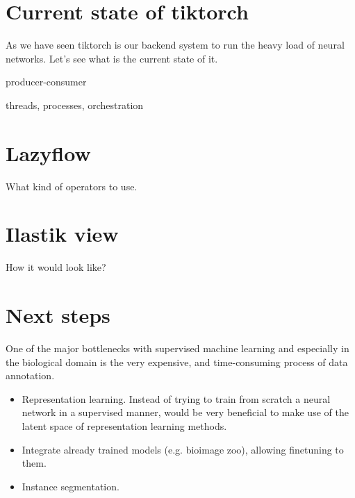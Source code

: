 \documentclass[12pt, a4paper]{article}
\begin{document}
\section{Current state of tiktorch}

As we have seen tiktorch is our backend system to run the heavy load of neural networks. Let's see what is the current state of it.

producer-consumer

threads, processes, orchestration

\section{Lazyflow}

What kind of operators to use.

\section{Ilastik view}

How it would look like?


\section{Next steps}
\label{sec:next_steps}

One of the major bottlenecks with supervised machine learning and especially in the biological domain is the very expensive, and time-consuming process of data annotation.

\begin{itemize}
    \item Representation learning. Instead of trying to train from scratch a neural network in a supervised manner, would be very beneficial to make use of the latent space of representation learning methods.
    \item Integrate already trained models (e.g. bioimage zoo), allowing finetuning to them.
    \item Instance segmentation.

\end{itemize}

\clearpage



\end{document}
